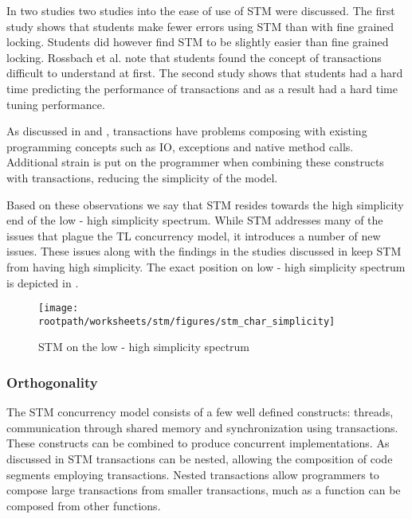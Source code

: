In  two studies two studies into the ease of use of \ac{STM} were discussed. The first study shows that students make fewer errors using \ac{STM} than with fine grained locking. Students did however find \ac{STM} to be slightly easier than fine grained locking. Rossbach et al. note that students found the concept of transactions difficult to understand at first. The second study shows that students had a hard time predicting the performance of transactions and as a result had a hard time tuning performance.

As discussed in  and , transactions have problems composing with existing programming concepts such as \ac{IO}, exceptions and native method calls. Additional strain is put on the programmer when combining these constructs with transactions, reducing the simplicity of the model.

Based on these observations we say that \ac{STM} resides towards the high simplicity end of the low - high simplicity spectrum. While \ac{STM} addresses many of the issues that plague the \ac{TL} concurrency model, it introduces a number of new issues. These issues along with the findings in the studies discussed in  keep \ac{STM} from having high simplicity. The exact position on low - high simplicity spectrum is depicted in .

\begin{figure}[htbp]
\centering
 \texttt{[image: \\rootpath/worksheets/stm/figures/stm\_char\_simplicity]} 
 \caption{\ac{STM} on the low - high simplicity spectrum}
\label{fig:stm_char_simplicity}
\end{figure}

\subsubsection{Orthogonality}\label{sec:stm_orthogonality}
\label{subsec:stm_orthogonality}
The \ac{STM} concurrency model consists of a few well defined constructs: threads, communication through shared memory and synchronization using transactions. These constructs can be combined to produce concurrent implementations. As discussed in  \ac{STM} transactions can be nested, allowing the composition of code segments employing transactions. Nested transactions allow programmers to compose large transactions from smaller transactions, much as a function can be composed from other functions.


